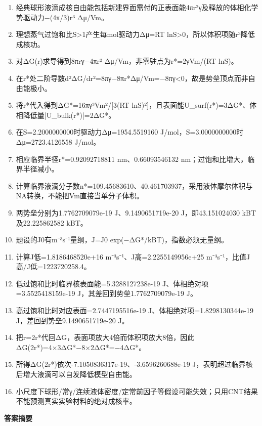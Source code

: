 \documentclass[UTF8,11pt,a4paper]{ctexart}
\begin{document}
\begin{enumerate}
\item 经典球形液滴成核自由能包括新建界面需付的正表面能4πr²γ及释放的体相化学势驱动力−(4π/3)r³ Δμ/Vm。
\item 理想蒸气过饱和比S>1产生每mol驱动力Δμ=RT lnS>0，所以体积项随r³降低成核功。
\item 对ΔG(r)求导得到8πrγ−4πr² Δμ/Vm，非零驻点为r*=2γVm/(RT lnS)。
\item 在r*处二阶导数d²ΔG/dr²=8πγ−8πr*Δμ/Vm=−8πγ<0，故是势垒顶点而非自由能极小。
\item 将r*代入得到ΔG*=16πγ³Vm²/[3(RT lnS)²]，且表面能U\_surf(r*)=3ΔG*、体相降低量|U\_bulk(r*)|=2ΔG*。
\item 在S=2.2000000000时驱动力Δμ=1954.5519160 J/mol，S=3.0000000000时Δμ=2723.4126558 J/mol。
\item 相应临界半径r*=0.92092718811 nm、0.66093546132 nm；过饱和比增大，临界半径减小。
\item 计算临界液滴分子数n*=109.45683610、40.461703937，采用液体摩尔体积与NA转换，不能把Vm直接当单分子体积。
\item 两势垒分别为1.7762709079e-19 J、9.1490651719e-20 J，即43.151024030 kBT及22.225862582 kBT。
\item 题设的J0有m⁻³s⁻¹量纲，J=J0 exp(−ΔG*/kBT)，指数必须无量纲。
\item 计算J低=1.8186468520e+16 m⁻³s⁻¹、J高=2.2255149956e+25 m⁻³s⁻¹，比值J高/J低=1223720258.4。
\item 低过饱和比时临界核表面能=5.3288127238e-19 J、体相绝对项=3.5525418159e-19 J，其差回到势垒1.7762709079e-19 J。
\item 高过饱和比时对应表面=2.7447195516e-19 J、体相绝对项=1.8298130344e-19 J，差回到势垒9.1490651719e-20 J。
\item 把r=2r*代回ΔG，表面项放大4倍而体积项放大8倍，因此ΔG(2r*)=4×3ΔG*−8×2ΔG*=−4ΔG*。
\item 所得ΔG(2r*)依次-7.1050836317e-19、-3.6596260688e-19 J，表明超过临界核后增大液滴可以自发降低模型自由能。
\item 小尺度下球形/常γ/连续液体密度/定常前因子等假设可能失效；只用CNT结果不能预测真实实验材料的绝对成核率。
\end{enumerate}
\noindent\textbf{答案摘要}\par
\end{document}
